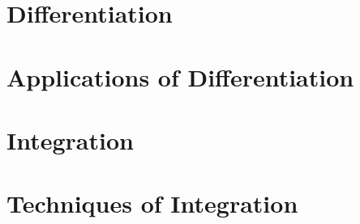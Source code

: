 \documentclass[11pt, a4paper, oneside]{memoir}
\begin{document}
\frontmatter*
{}





\setcounter{page}{4}

\tableofcontents*



\mainmatter*
{}

\part{Differentiation}












\part{Applications of Differentiation}
\Blinddocument







\part{Integration}
\Blinddocument

\part{Techniques of Integration}
\Blinddocument

\backmatter
\Blinddocument







\end{document}
